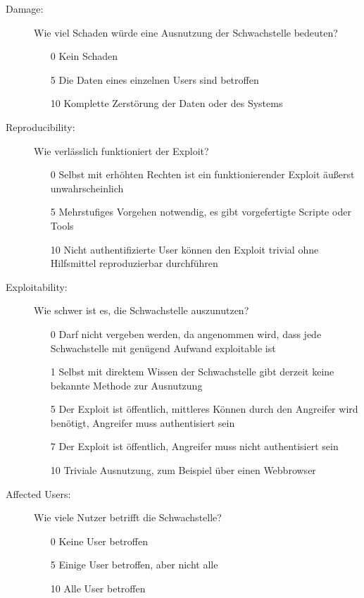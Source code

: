 		\begin{description}
			\item[Damage: ] Wie viel Schaden würde eine Ausnutzung der Schwachstelle bedeuten?
			\begin{itemize}
				\item[0] Kein Schaden
				\item[5] Die Daten eines einzelnen Users sind betroffen
				\item[10] Komplette Zerstörung der Daten oder des Systems 
			\end{itemize}
			
			\item[Reproducibility: ] Wie verlässlich funktioniert der Exploit?
			\begin{itemize}
				\item[0] Selbst mit erhöhten Rechten ist ein funktionierender Exploit äußerst unwahrscheinlich
				\item[5] Mehrstufiges Vorgehen notwendig, es gibt vorgefertigte Scripte oder Tools
				\item[10] Nicht authentifizierte User können den Exploit trivial ohne Hilfsmittel reproduzierbar durchführen
			\end{itemize}
			
			\item[Exploitability: ] Wie schwer ist es, die Schwachstelle auszunutzen?
			\begin{itemize}
				\item[0] Darf nicht vergeben werden, da angenommen wird, dass jede Schwachstelle mit genügend Aufwand exploitable ist
				\item[1] Selbst mit direktem Wissen der Schwachstelle gibt derzeit keine bekannte Methode zur Ausnutzung
				\item[5] Der Exploit ist öffentlich, mittleres Können durch den Angreifer wird benötigt, Angreifer muss authentisiert sein
				\item[7] Der Exploit ist öffentlich, Angreifer muss nicht authentisiert sein
				\item[10] Triviale Ausnutzung, zum Beispiel über einen Webbrowser
			\end{itemize}
			
			\item[Affected Users: ] Wie viele Nutzer betrifft die Schwachstelle?
			\begin{itemize}
				\item[0] Keine User betroffen
				\item[5] Einige User betroffen, aber nicht alle
				\item[10] Alle User betroffen
			\end{itemize}
			

\end{description}
